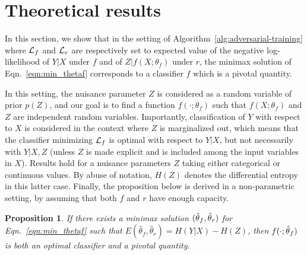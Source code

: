 \documentclass{article}
\theoremstyle{plain}
\newtheorem{proposition}[theorem]{Proposition}
\begin{document}

\section{Theoretical results}
\label{sec:theory}

In this section, we show that in the setting of
Algorithm~\ref{alg:adversarial-training} where ${\cal L}_f$ and ${\cal L}_r$ are
respectively set to expected value of the negative log-likelihood of $Y|X$ under
$f$ and of $Z|f(X;\theta_f)$ under $r$, the minimax solution of Eqn.~\ref{eqn:min_thetaf}
corresponds to a classifier
$f$ which is a pivotal quantity.

In this setting, the nuisance parameter $Z$ is considered as a random variable
of prior $p(Z)$, and our goal is to find a function
$f(\cdot;\theta_f)$ such that $f(X;\theta_f)$ and $Z$ are independent random
variables.   Importantly, classification of $Y$ with respect to $X$ is
considered in the context where $Z$ is marginalized out, which means that the
classifier minimizing ${\cal L}_f$ is optimal with respect to $Y|X$, but not
necessarily with $Y|X,Z$ (unless $Z$ is made explicit and is included among the
input variables in $X$). Results hold for a nuisance parameters $Z$ taking either
categorical or continuous values. By abuse of notation, $H(Z)$ denotes the
differential entropy in this latter case. Finally, the  proposition below is
derived in a non-parametric setting, by assuming that both $f$ and $r$ have
enough capacity.

\begin{proposition}\label{prop:2}
If there exists a minimax solution $(\smash{\hat\theta}_f, \smash{\hat\theta}_r)$
for Eqn.~\ref{eqn:min_thetaf} such that
$E(\hat\theta_f, \hat\theta_r) = H({Y|X}) - H(Z)$, then
$f(\cdot;\smash{\hat\theta}_f)$ is both an optimal classifier and a pivotal
quantity.
\end{proposition}
\end{document}
